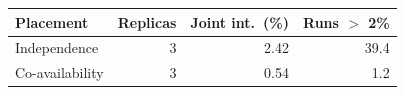 \begin{tabular}{@{}lrrr@{}}
\toprule
Placement & Replicas & Joint int.\ (\%) & Runs $>$ 2\% \\
\midrule
Independence & 3 & 2.42 & 39.4 \\
Co-availability & 3 & 0.54 & 1.2 \\
\bottomrule
\end{tabular}
